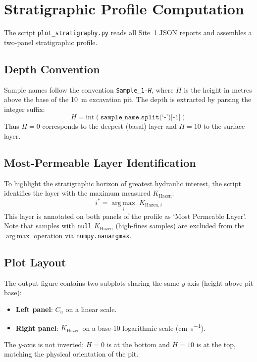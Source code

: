 \documentclass[12pt,a4paper]{article}
\begin{document}
\section{Stratigraphic Profile Computation}
\label{sec:stratigraphy}

The script \texttt{plot\_stratigraphy.py} reads all Site~1 JSON reports and
assembles a two-panel stratigraphic profile.

\subsection{Depth Convention}

Sample names follow the convention \texttt{Sample\_1-\textit{H}}, where
$H$ is the height in metres above the base of the \SI{10}{\metre} excavation
pit.  The depth is extracted by parsing the integer suffix:
\[
    H = \mathrm{int}\!\left(\texttt{sample\_name.split(`-')[-1]}\right)
\]
Thus $H = 0$ corresponds to the deepest (basal) layer and $H = 10$ to the
surface layer.

\subsection{Most-Permeable Layer Identification}

To highlight the stratigraphic horizon of greatest hydraulic interest, the
script identifies the layer with the maximum measured $K_{\mathrm{Hazen}}$:
\begin{equation}
    i^{*} = \operatorname*{arg\,max}_{i} \; K_{\mathrm{Hazen},i}
    \label{eq:anomaly}
\end{equation}
This layer is annotated on both panels of the profile as
\enquote*{Most Permeable Layer}.  Note that samples with \texttt{null}
$K_{\mathrm{Hazen}}$ (high-fines samples) are excluded from the
$\operatorname{arg\,max}$ operation via \texttt{numpy.nanargmax}.

\subsection{Plot Layout}

The output figure contains two subplots sharing the same $y$-axis (height
above pit base):
\begin{itemize}
    \item \textbf{Left panel}: $C_u$ on a linear scale.
    \item \textbf{Right panel}: $K_{\mathrm{Hazen}}$ on a base-10 logarithmic
          scale (\si{\centi\metre\per\second}).
\end{itemize}
The $y$-axis is not inverted; $H = 0$ is at the bottom and $H = 10$ is at
the top, matching the physical orientation of the pit.
\end{document}
